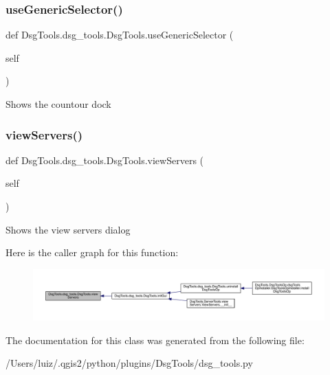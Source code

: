 \subsubsection{\texorpdfstring{use\+Generic\+Selector()}{useGenericSelector()}}
{\footnotesize\ttfamily def Dsg\+Tools.\+dsg\+\_\+tools.\+Dsg\+Tools.\+use\+Generic\+Selector (\begin{DoxyParamCaption}\item[{}]{self }\end{DoxyParamCaption})}

\begin{DoxyVerb}Shows the countour dock
\end{DoxyVerb}
 \mbox{\label{class_dsg_tools_1_1dsg__tools_1_1_dsg_tools_a0f0a89cfc7afda1ca1ec10c6e59e3541}} 
\subsubsection{\texorpdfstring{view\+Servers()}{viewServers()}}
{\footnotesize\ttfamily def Dsg\+Tools.\+dsg\+\_\+tools.\+Dsg\+Tools.\+view\+Servers (\begin{DoxyParamCaption}\item[{}]{self }\end{DoxyParamCaption})}

\begin{DoxyVerb}Shows the view servers dialog
\end{DoxyVerb}
 Here is the caller graph for this function\+:
\nopagebreak
\begin{figure}[H]
\begin{center}
\leavevmode
\includegraphics[width=350pt]{class_dsg_tools_1_1dsg__tools_1_1_dsg_tools_a0f0a89cfc7afda1ca1ec10c6e59e3541_icgraph}
\end{center}
\end{figure}


The documentation for this class was generated from the following file\+:\begin{DoxyCompactItemize}
\item 
/\+Users/luiz/.\+qgis2/python/plugins/\+Dsg\+Tools/dsg\+\_\+tools.\+py\end{DoxyCompactItemize}
